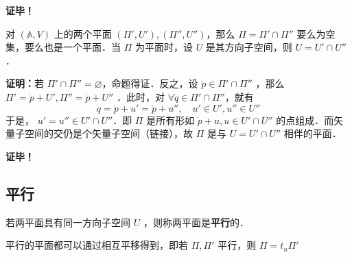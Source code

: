 \textbf{证毕！}
\begin{corollary}{}
对 $(\mathbb A,V)$ 上的两个平面 $(\Pi',U'),(\Pi'',U'')$，那么 $\Pi=\Pi'\cap\Pi''$ 要么为空集，要么也是一个平面．当 $\Pi$ 为平面时，设 $U$ 是其方向子空间，则 $U=U'\cap U''$．
\end{corollary}
\textbf{证明：}若 $\Pi'\cap\Pi''=\varnothing$，命题得证．反之，设 $\dot p\in \Pi'\cap\Pi''$ ，那么 $\Pi'=\dot p+U',\Pi''=\dot p+U''$ ．此时，对 $\forall\dot q\in\Pi'\cap\Pi''$，就有 \begin{equation}
\dot q=\dot p+u'=\dot p+u'',\quad u'\in U',u''\in U''
\end{equation}
于是， $u'=u''\in U'\cap U''$．即 $\Pi$ 是所有形如 $\dot p+u,u\in U'\cap U''$ 的点组成．而矢量子空间的交仍是个矢量子空间（链接），故 $\Pi$ 是与 $U=U'\cap U''$ 相伴的平面．

\textbf{证毕！}
\subsection{平行}

\begin{definition}{}
若两平面具有同一方向子空间 $U$ ，则称两平面是\textbf{平行}的．
\end{definition}
\begin{theorem}{}
平行的平面都可以通过相互平移得到，即若 $\Pi,\Pi'$ 平行，则 $\Pi=t_{u}\Pi'$

\end{theorem}